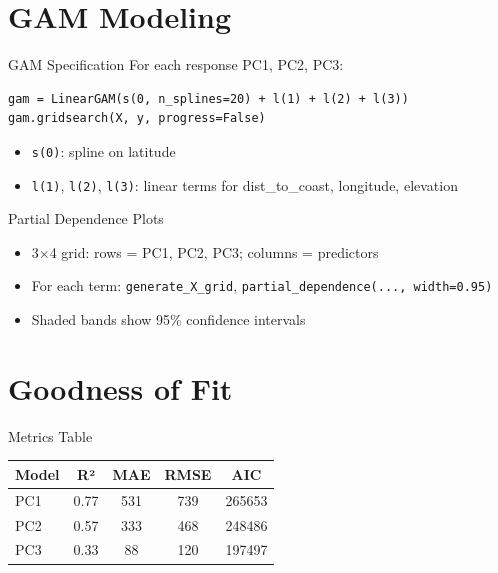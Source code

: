 \documentclass{beamer}
\begin{document}
\section{GAM Modeling}

\begin{frame}{GAM Specification}
For each response PC1, PC2, PC3:
\begin{lstlisting}
gam = LinearGAM(s(0, n_splines=20) + l(1) + l(2) + l(3))
gam.gridsearch(X, y, progress=False)
\end{lstlisting}
\begin{itemize}
\item \texttt{s(0)}: spline on latitude
\item \texttt{l(1)}, \texttt{l(2)}, \texttt{l(3)}: linear terms for dist\_to\_coast, longitude, elevation
\end{itemize}
\end{frame}

\begin{frame}{Partial Dependence Plots}
\begin{itemize}
\item 3$\times$4 grid: rows = PC1, PC2, PC3; columns = predictors
\item For each term: \texttt{generate\_X\_grid}, \texttt{partial\_dependence(..., width=0.95)}
\item Shaded bands show 95\% confidence intervals
\end{itemize}
\vspace{0.3em}
\end{frame}

\section{Goodness of Fit}

\begin{frame}{Metrics Table}
\begin{center}
\begin{tabular}{lcccc}
\toprule
\textbf{Model} & \textbf{R²} & \textbf{MAE} & \textbf{RMSE} & \textbf{AIC} \\
\midrule
PC1 & 0.77 & 531 & 739 & 265653 \\
PC2 & 0.57 & 333 & 468 & 248486 \\
PC3 & 0.33 & 88 & 120 & 197497 \\
\bottomrule
\end{tabular}
\end{center}
\end{frame}
\end{document}
